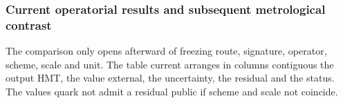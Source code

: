 \let\subsection\subsubsection
\let\subsubsection\paragraph
\let\clearpage\relax

\endgroup
\begingroup
\let\chapter\section
\let\section\subsection
\let\subsection\subsubsection
\let\subsubsection\paragraph
\let\clearpage\relax

\endgroup

\section{Current operatorial results and subsequent metrological contrast}
The comparison only opens afterward of freezing route, signature, operator,
scheme, scale and unit. The table current arranges in columns contiguous the
output HMT, the value external, the uncertainty, the residual and the status. The
values quark not admit a residual public if scheme and scale not coincide.

